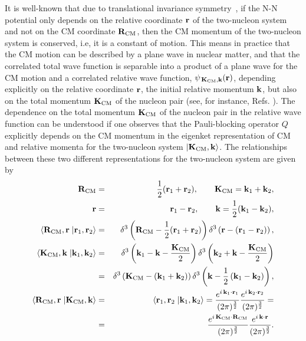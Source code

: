 \documentclass[aps,twocolumn,showpacs,preprintnumbers,amsmath,amssymb,nofootinbib,superscriptaddress,showkeys,noeprint]{revtex4-1}
\newcommand{\nk}{{\bf k}}
\newcommand{\nK}{{\bf K}}
\newcommand{\nr}{{\bf r}}
\newcommand{\nR}{{\bf R}}
\begin{document}
It is well-known that due to translational invariance
symmetry~\cite{Walecka1995}, if the N-N potential only depends on the
relative coordinate $\nr$ of the two-nucleon system and not on the CM
coordinate $\nR_{\rm CM}$, then the CM momentum of the two-nucleon
system is conserved, i.e, it is a constant of motion. This means in
practice that the CM motion can be described by a plane wave in
nuclear matter, and that the correlated total wave function is
separable into a product of a plane wave for the CM motion and a
correlated relative wave function, $\psi_{\,\nK_{\rm CM},\nk}(\nr)$,
depending explicitly on the relative coordinate $\nr$, the initial
relative momentum $\nk$, but also on the total momentum $\nK_{\rm CM}$
of the nucleon pair (see, for instance, Refs. \cite{RuizSimo:2016vsh,
  Walecka1995}).  The dependence on the total momentum $\nK_{\rm CM}$
of the nucleon pair in the relative wave function can be understood if
one observes that the Pauli-blocking operator $Q$ explicitly depends
on the CM momentum in the eigenket representation of CM and relative
momenta for the two-nucleon system $\left|\nK_{\rm
  CM},\nk\right\rangle$. The relationships between these two different
representations for the two-nucleon system are given by
\begin{eqnarray}
\nR_{\rm CM}&=&\frac12(\nr_1+\nr_2), \qquad \nK_{\rm CM}=\nk_1+\nk_2,
\nonumber\\
\nr&=&\nr_1-\nr_2, \qquad \nk=\frac12(\nk_1-\nk_2),\nonumber\\
\left\langle\nR_{\rm CM},\nr\right.\left|\nr_1,\nr_2\right\rangle&=&
\delta^3\left(\nR_{\rm CM}-\frac12(\nr_1+\nr_2) \right) 
\delta^3\left(\nr-\left(\nr_1-\nr_2 \right) \right),\nonumber\\
\left\langle\nK_{\rm CM},\nk\right.\left|\nk_1,\nk_2\right\rangle&=&
\delta^3\left(\nk_1-\nk-\frac{\nK_{\rm CM}}{2} \right) 
\delta^3\left(\nk_2+\nk-\frac{\nK_{\rm CM}}{2} \right)\nonumber\\
&=&\delta^3\left(\nK_{\rm CM}-\left(\nk_1+\nk_2 \right) \right)
\delta^3\left(\nk-\frac12\left(\nk_1-\nk_2\right)\right),\nonumber\\
\left\langle\nR_{\rm CM},\nr\right.\left|\nK_{\rm CM},\nk\right\rangle&=&
\left\langle\nr_1,\nr_2\right.\left|\nk_1,\nk_2\right\rangle=
\frac{e^{i\, \nk_1\cdot\nr_1}}{(2\pi)^{\frac32}}
\frac{e^{i\, \nk_2\cdot\nr_2}}{(2\pi)^{\frac32}}=\nonumber\\
&=&\frac{e^{i\, \nK_{\rm CM}\cdot\nR_{\rm CM}}}{(2\pi)^{\frac32}}
\frac{e^{i\, \nk\cdot\nr}}{(2\pi)^{\frac32}}.\label{CM_single_part_represent}
\end{eqnarray}
\end{document}
